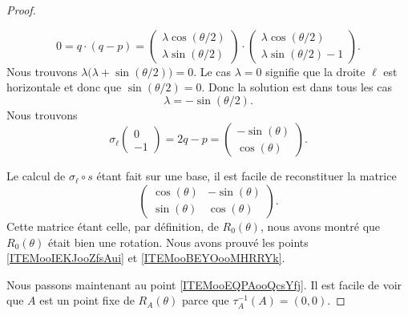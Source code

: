 \begin{proof}
\begin{subproof}
        \begin{equation}
            0=q\cdot(q-p)=\begin{pmatrix}
                \lambda\cos(\theta/2)    \\ 
                \lambda\sin(\theta/2)    
            \end{pmatrix}\cdot\begin{pmatrix}
                \lambda\cos(\theta/2)    \\ 
                \lambda\sin(\theta/2)-1    
            \end{pmatrix}.
        \end{equation}
        Nous trouvons \( \lambda\big( \lambda+\sin(\theta/2) \big)=0\). Le cas \( \lambda=0\) signifie que la droite \( \ell\) est horizontale et donc que \( \sin(\theta/2)=0\). Donc la solution est dans tous les cas
        \begin{equation}
            \lambda=-\sin(\theta/2).
        \end{equation}
        Nous trouvons
        \begin{equation}
            \sigma_{\ell}\begin{pmatrix}
                0    \\ 
                -1    
            \end{pmatrix}=2q-p=\begin{pmatrix}
                -\sin(\theta)    \\ 
                \cos(\theta)    
            \end{pmatrix}.
        \end{equation}
    \end{subproof}
    Le calcul de \( \sigma_{\ell}\circ s\) étant fait sur une base, il est facile de reconstituer la matrice
    \begin{equation}
        \begin{pmatrix}
            \cos(\theta)    &   -\sin(\theta)    \\ 
            \sin(\theta)    &   \cos(\theta)    
        \end{pmatrix}.
    \end{equation}
    Cette matrice étant celle, par définition, de \( R_0(\theta)\), nous avons montré que \( R_0(\theta)\) était bien une rotation. Nous avons prouvé les points \ref{ITEMooIEKJooZfsAui} et \ref{ITEMooBEYOooMHRRYk}.

    Nous passons maintenant au point \ref{ITEMooEQPAooQcsYfj}. Il est facile de voir que \( A\) est un point fixe de \( R_{A}(\theta)\) parce que \( \tau_A^{-1}(A)=(0,0)\).


\end{proof}
